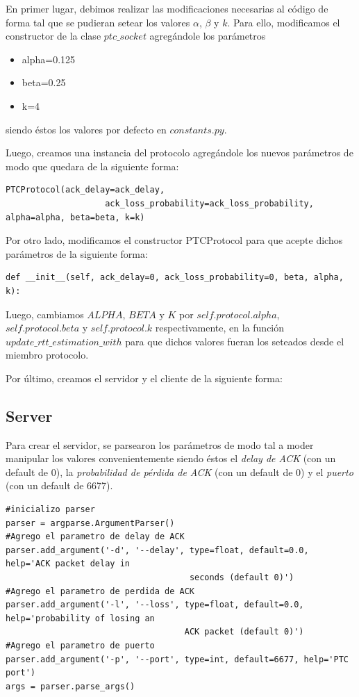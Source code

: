 \documentclass[10pt, a4paper]{article}
\begin{document}
En primer lugar, debimos realizar las modificaciones necesarias al código de forma tal que se pudieran setear los valores $\alpha$, $\beta$ y $k$. 
Para ello, modificamos el constructor de la clase $ptc\_socket$ agregándole los parámetros 
\begin{itemize}
\item alpha=0.125
\item beta=0.25
\item k=4
\end{itemize}
siendo éstos los valores por defecto en $constants.py$.

Luego, creamos una instancia del protocolo agregándole los nuevos parámetros de modo que quedara de la siguiente forma:
\begin{verbatim}
PTCProtocol(ack_delay=ack_delay, 
					ack_loss_probability=ack_loss_probability, alpha=alpha, beta=beta, k=k)
\end{verbatim}

Por otro lado, modificamos el constructor PTCProtocol para que acepte dichos parámetros de la siguiente forma:
\begin{verbatim}
def __init__(self, ack_delay=0, ack_loss_probability=0, beta, alpha, k):
\end{verbatim}

Luego, cambiamos $ALPHA$, $BETA$ y $K$ por $self.protocol.alpha$, $self.protocol.beta$ y $self.protocol.k$ respectivamente, en la función $update\_rtt\_estimation\_with$ para que dichos valores fueran los seteados desde el miembro protocolo.

Por último, creamos el servidor y el cliente de la siguiente forma:

\subsection{Server}

Para crear el servidor, se parsearon los parámetros de modo tal a moder manipular los valores convenientemente siendo éstos el \textit{delay de ACK} (con un default de 0), la \textit{probabilidad de pérdida de ACK} (con un default de 0) y el \textit{puerto} (con un default de 6677).

\begin{verbatim}
#inicializo parser
parser = argparse.ArgumentParser()
#Agrego el parametro de delay de ACK
parser.add_argument('-d', '--delay', type=float, default=0.0, help='ACK packet delay in
									 seconds (default 0)')
#Agrego el parametro de perdida de ACK
parser.add_argument('-l', '--loss', type=float, default=0.0, help='probability of losing an 
									ACK packet (default 0)')
#Agrego el parametro de puerto
parser.add_argument('-p', '--port', type=int, default=6677, help='PTC port')
args = parser.parse_args()
\end{verbatim}
\end{document}
